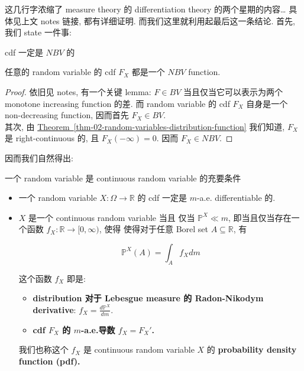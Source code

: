 \documentclass{qlnotes-export}
\begin{document}
这几行字浓缩了 measure theory 的 differentiation theory 的两个星期的内容\ldots{} 具体见上文 notes 链接, 都有详细证明. 而我们这里就利用起最后这一条结论. 首先, 我们 state 一件事:

\begin{lemma}{cdf 一定是 \(NBV\) 的}\label{lem-02-random-variables-cdf-nbv}

任意的 random variable 的 cdf \(F_{X}\) 都是一个 \(NBV\) function.

\end{lemma}

\begin{proof}

依旧见 notes, 有一个关键 lemma: \(F \in BV\) 当且仅当它可以表示为两个 monotone increasing function 的差. 而 random variable 的 cdf \(F_{X}\) 自身是一个 non-decreasing function, 因而首先 \(F_{X} \in BV\).\\
其次, 由 \hyperref[thm-02-random-variables-distribution-function]{Theorem~\ref*{thm-02-random-variables-distribution-function}} 我们知道, \(F_{X}\) 是 right-continuous 的, 且 \(F_{X}( - \infty) = 0\). 因而 \(F_{X} \in NBV\).

\end{proof}

因而我们自然得出:

\begin{theorem}{一个 random variable 是 continuous random variable 的充要条件}\label{thm-02-random-variables-random-variable-continuous-random-variable}

\begin{itemize}
\item
  一个 random variable \(X:\Omega\rightarrow{\mathbb{R}}\) 的 cdf 一定是 \(m\)-a.e. differentiable 的.
\item
  \(X\) 是一个 continuous random variable 当且 仅当 \({\mathbb{P}}^{X} \ll m\), 即当且仅当存在一个函数 \(f_{X}:{\mathbb{R}}\rightarrow\lbrack 0,\infty)\), 使得 使得对于任意 Borel set \(A \subseteq {\mathbb{R}}\), 有

  \[{\mathbb{P}}^{X}(A) = \int_{A}f_{X} dm\]

  这个函数 \(f_{X}\) 即是:

  \begin{itemize}
  \item
    \textbf{distribution 对于 Lebesgue measure 的 Radon-Nikodym derivative}: \(f_{X} = \frac{d{\mathbb{P}}^{X}}{dm}\).
  \item
    \textbf{cdf \(F_{X}\) 的 \(m\)-a.e.导数 \(f_{X} = F_{X}'\).}
  \end{itemize}

  我们也称这个 \(f_{X}\) 是 continuous random variable \(X\) 的 \textbf{probability density function (pdf).}
\end{itemize}

\end{theorem}
\end{document}
